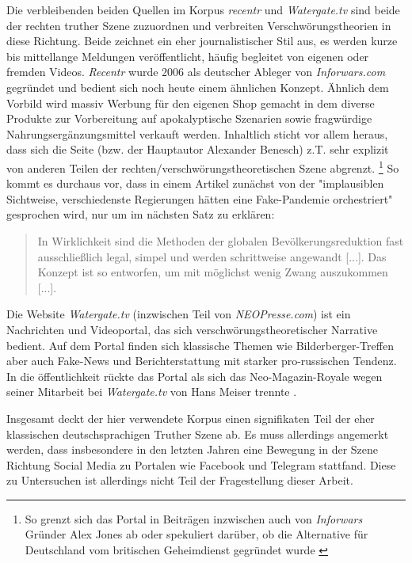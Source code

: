 Die verbleibenden beiden Quellen im Korpus \textit{recentr} und \textit{Watergate.tv} sind beide der rechten truther Szene zuzuordnen und verbreiten Verschwörungstheorien in diese Richtung.
Beide zeichnet ein eher journalistischer Stil aus, es werden kurze bis mittellange Meldungen veröffentlicht, häufig begleitet von eigenen oder fremden Videos.
\textit{Recentr} wurde 2006 als deutscher Ableger von \textit{Inforwars.com} gegründet und bedient sich noch heute einem ähnlichen Konzept.
Ähnlich dem Vorbild wird massiv Werbung für den eigenen Shop gemacht in dem diverse Produkte zur Vorbereitung auf apokalyptische Szenarien sowie fragwürdige Nahrungsergänzungsmittel verkauft werden.
Inhaltlich sticht vor allem heraus, dass sich die Seite (bzw. der Hauptautor Alexander Benesch) z.T. sehr explizit von anderen Teilen der rechten/verschwörungstheoretischen Szene abgrenzt.
\footnote{So grenzt sich das Portal in Beiträgen inzwischen auch von \textit{Inforwars} Gründer Alex Jones ab \parencite*{recentr-jones} oder spekuliert darüber, ob die Alternative für Deutschland vom britischen Geheimdienst gegründet wurde \parencite{recentr-afd}}
So kommt es durchaus vor, dass in einem Artikel zunächst von der "implausiblen Sichtweise, verschiedenste Regierungen hätten eine Fake-Pandemie orchestriert" \parencite{recentr-population} gesprochen wird, nur um im nächsten Satz zu erklären: 

\begin{quotation}
    In Wirklichkeit sind die Methoden der globalen Bevölkerungsreduktion fast ausschließlich legal, simpel und werden schrittweise angewandt [...]. Das Konzept ist so entworfen, um mit möglichst wenig Zwang auszukommen [...]. \parencite{recentr-population}
\end{quotation} 

Die Website \textit{Watergate.tv} (inzwischen Teil von \textit{NEOPresse.com}) ist ein Nachrichten und Videoportal, das sich verschwörungstheoretischer Narrative bedient. 
Auf dem Portal finden sich klassische Themen wie Bilderberger-Treffen \parencite[vgl.][]{watergate-bilderberger} aber auch Fake-News und Berichterstattung mit starker pro-russischen Tendenz.
In die öffentlichkeit rückte das Portal als sich das Neo-Magazin-Royale wegen seiner Mitarbeit bei \textit{Watergate.tv} von Hans Meiser trennte \parencite*[Siehe z.B.][]{spiegel-watergate}.

Insgesamt deckt der hier verwendete Korpus einen signifikaten Teil der eher klassischen deutschsprachigen Truther Szene ab.
Es muss allerdings angemerkt werden, dass insbesondere in den letzten Jahren eine Bewegung in der Szene Richtung Social Media zu Portalen wie Facebook und Telegram stattfand.
Diese zu Untersuchen ist allerdings nicht Teil der Fragestellung dieser Arbeit.

